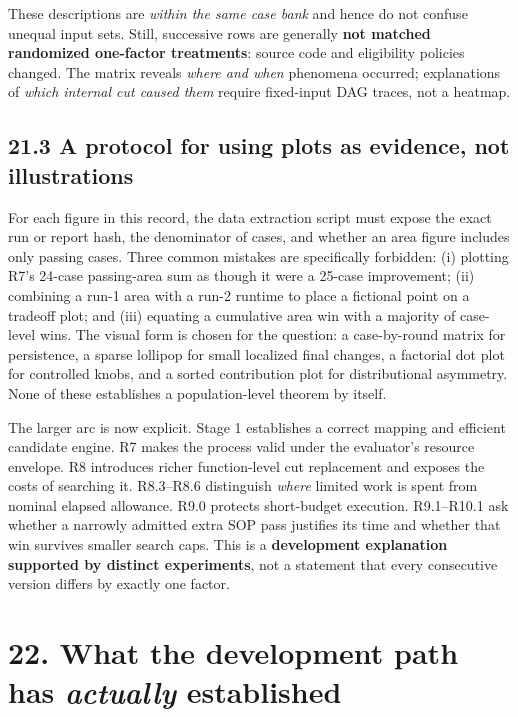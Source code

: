 \documentclass[a4paper,10pt]{article}
\theoremstyle{definition}
\theoremstyle{remark}
\begin{document}
These descriptions are \emph{within the same case bank} and hence do not confuse unequal input sets. Still, successive rows are generally \textbf{not matched randomized one-factor treatments}: source code and eligibility policies changed. The matrix reveals \emph{where and when} phenomena occurred; explanations of \emph{which internal cut caused them} require fixed-input DAG traces, not a heatmap.

\subsection{21.3 A protocol for using plots as evidence, not illustrations}\label{a-protocol-for-using-plots-as-evidence-not-illustrations}

For each figure in this record, the data extraction script must expose the exact run or report hash, the denominator of cases, and whether an area figure includes only passing cases. Three common mistakes are specifically forbidden: (i) plotting R7's 24-case passing-area sum as though it were a 25-case improvement; (ii) combining a run-1 area with a run-2 runtime to place a fictional point on a tradeoff plot; and (iii) equating a cumulative area win with a majority of case-level wins. The visual form is chosen for the question: a case-by-round matrix for persistence, a sparse lollipop for small localized final changes, a factorial dot plot for controlled knobs, and a sorted contribution plot for distributional asymmetry. None of these establishes a population-level theorem by itself.

The larger arc is now explicit. Stage 1 establishes a correct mapping and efficient candidate engine. R7 makes the process valid under the evaluator's resource envelope. R8 introduces richer function-level cut replacement and exposes the costs of searching it. R8.3--R8.6 distinguish \emph{where} limited work is spent from nominal elapsed allowance. R9.0 protects short-budget execution. R9.1--R10.1 ask whether a narrowly admitted extra SOP pass justifies its time and whether that win survives smaller search caps. This is a \textbf{development explanation supported by distinct experiments}, not a statement that every consecutive version differs by exactly one factor.



\section{\texorpdfstring{22. What the development path has \emph{actually} established}{22. What the development path has actually established}}\label{what-the-development-path-has-actually-established}
\end{document}
